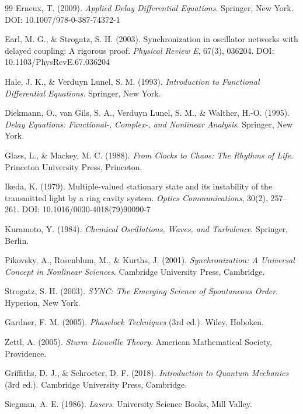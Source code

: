 \documentclass[pdflatex,sn-mathphys-num]{sn-jnl}
\begin{document}
    
    \begin{thebibliography}{99}
         Erneux, T. (2009). \textit{Applied Delay Differential Equations}. Springer, New York. DOI: 10.1007/978-0-387-74372-1

         Earl, M. G., \& Strogatz, S. H. (2003). Synchronization in oscillator networks with delayed coupling: A rigorous proof. \textit{Physical Review E}, 67(3), 036204. DOI: 10.1103/PhysRevE.67.036204

         Hale, J. K., \& Verduyn Lunel, S. M. (1993). \textit{Introduction to Functional Differential Equations}. Springer, New York.

         Diekmann, O., van Gils, S. A., Verduyn Lunel, S. M., \& Walther, H.-O. (1995). \textit{Delay Equations: Functional-, Complex-, and Nonlinear Analysis}. Springer, New York.

         Glass, L., \& Mackey, M. C. (1988). \textit{From Clocks to Chaos: The Rhythms of Life}. Princeton University Press, Princeton.

         Ikeda, K. (1979). Multiple-valued stationary state and its instability of the transmitted light by a ring cavity system. \textit{Optics Communications}, 30(2), 257--261. DOI: 10.1016/0030-4018(79)90090-7

         Kuramoto, Y. (1984). \textit{Chemical Oscillations, Waves, and Turbulence}. Springer, Berlin.

         Pikovsky, A., Rosenblum, M., \& Kurths, J. (2001). \textit{Synchronization: A Universal Concept in Nonlinear Sciences}. Cambridge University Press, Cambridge.

         Strogatz, S. H. (2003). \textit{SYNC: The Emerging Science of Spontaneous Order}. Hyperion, New York.

         Gardner, F. M. (2005). \textit{Phaselock Techniques} (3rd ed.). Wiley, Hoboken.

         Zettl, A. (2005). \textit{Sturm--Liouville Theory}. American Mathematical Society, Providence.

         Griffiths, D. J., \& Schroeter, D. F. (2018). \textit{Introduction to Quantum Mechanics} (3rd ed.). Cambridge University Press, Cambridge.

         Siegman, A. E. (1986). \textit{Lasers}. University Science Books, Mill Valley.
    \end{thebibliography}
\end{document}
